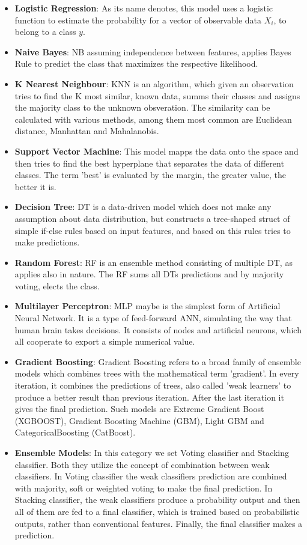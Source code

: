 \documentclass[journal,article,submit,pdftex,moreauthors]{Definitions/mdpi}
\begin{document}
\begin{itemize}
	\item \textbf{Logistic Regression}: As its name denotes, this model uses a logistic function to estimate the probability for 
	a vector of observable data $X_i$, to belong to a class $y$.
	\item \textbf{Naive Bayes}: NB assuming independence between features, applies Bayes Rule to predict the class that maximizes
	the respective likelihood.
	\item \textbf{K Nearest Neighbour}: KNN is an algorithm, which given an observation tries to find the K most similar, known 
	data, summs their classes and assigns the majority class to the unknown obsveration. The similarity can be calculated with
	various methods, among them most common are Euclidean distance, Manhattan and Mahalanobis.
	\item \textbf{Support Vector Machine}: This model mapps the data onto the space and then tries to find the best
	hyperplane that separates the data of different classes. The term 'best' is evaluated by the margin, the greater value, the
	better it is.
	\item \textbf{Decision Tree}: DT is a data-driven model which does not make any assumption about data distribution, but 
	constructs a tree-shaped struct of simple if-else rules based on input features, and based on this rules tries to make
	predictions.
	\item \textbf{Random Forest}: RF is an ensemble method consisting of multiple DT, as applies also in nature. The RF sums 
	all DTs predictions and by majority voting, elects the class.
	\item \textbf{Multilayer Perceptron}: MLP maybe is the simplest form of Artificial Neural Network. It is a type of feed-forward
	ANN, simulating the way that human brain takes decisions. It consists of nodes and artificial neurons, which all cooperate
	to export a simple numerical value.
	\item \textbf{Gradient Boosting}: Gradient Boosting refers to a broad family of ensemble models which combines trees with 
	the mathematical term 'gradient'. In every iteration, it combines the predictions of trees, also called 'weak learners' 
	to produce a better result than previous iteration. After the last iteration it gives the final prediction. Such models
	are Extreme Gradient Boost (XGBOOST), Gradient Boosting Machine (GBM), Light GBM and CategoricalBoosting (CatBoost).
    \item \textbf{Ensemble Models}: In this category we set Voting classifier and Stacking classifier. Both they utilize
    the concept of combination between weak classifiers. In Voting classifier the weak classifiers prediction are combined 
	with majority, soft or weighted voting to make the final prediction. In Stacking classifier, the weak classifiers 
    produce a probability output and then all of them are fed to a final classifier, which is trained based on probabilistic
	outputs, rather than conventional features. Finally, the final classifier makes a prediction.
\end{itemize}
\end{document}
